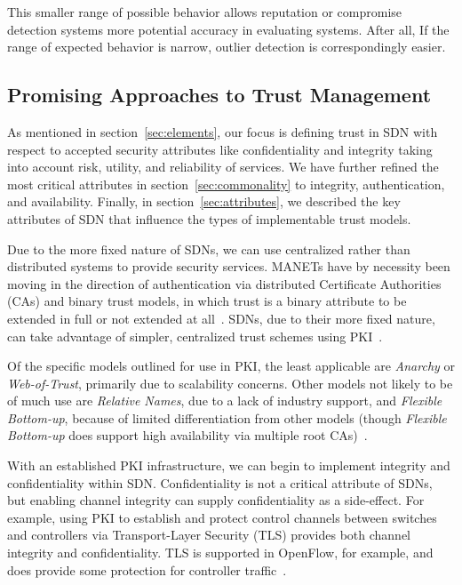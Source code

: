 \documentclass[10pt,conference]{IEEEtran}
\begin{document}
This smaller range of possible behavior allows reputation or compromise detection systems more potential accuracy in evaluating systems.  After all, If the range of expected behavior is narrow, outlier detection is correspondingly easier.

\subsection{Promising Approaches to Trust Management}
As mentioned in section~\ref{sec:elements}, our focus is defining trust in SDN with respect to accepted security attributes like confidentiality and integrity taking into account risk, utility, and reliability of services.  We have further refined the most critical attributes in section~\ref{sec:commonality} to integrity, authentication, and availability.  Finally, in section~\ref{sec:attributes}, we described the key attributes of SDN that influence the types of implementable trust models.

Due to the more fixed nature of SDNs, we can use centralized rather than distributed systems to provide security services.  MANETs have by necessity been moving in the direction of authentication via distributed Certificate Authorities (CAs) and binary trust models, in which trust is a binary attribute to be extended in full or not extended at all~\cite{OmChBo:09}. SDNs, due to their more fixed nature, can take advantage of simpler, centralized trust schemes using PKI~\cite{Pe:99}.

Of the specific models outlined for use in PKI, the least applicable are {\sl Anarchy} or {\sl Web-of-Trust}, primarily due to scalability concerns. Other models not likely to be of much use are {\sl Relative Names}, due to a lack of industry support, and {\sl Flexible Bottom-up}, because of limited differentiation from other models (though {\sl Flexible Bottom-up} does support high availability via multiple root CAs)~\cite{Pe:99}.

With an established PKI infrastructure, we can begin to implement integrity and confidentiality within SDN.  Confidentiality is not a critical attribute of SDNs, but enabling channel integrity can supply confidentiality as a side-effect.  For example, using PKI to establish and protect control channels between switches and controllers via Transport-Layer Security (TLS) provides both channel integrity and confidentiality.  TLS is supported in OpenFlow, for example, and does provide some protection for controller traffic~\cite{openflow1.4}.
\end{document}
